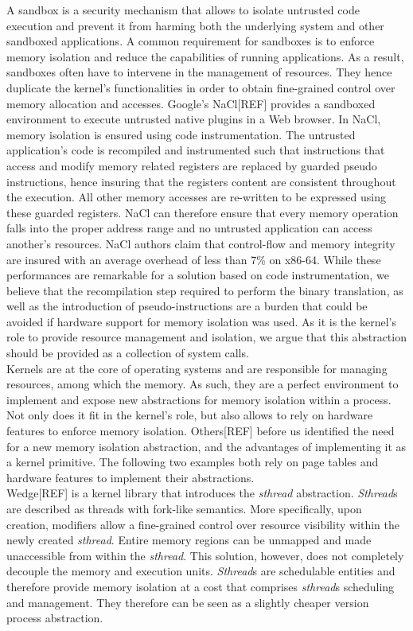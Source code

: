 \documentclass[letterpaper,twocolumn,10pt]{article}
\begin{document}
A sandbox is a security mechanism that allows to isolate untrusted code execution and prevent it from harming both the underlying system and other sandboxed applications.
A common requirement for sandboxes is to enforce memory isolation and reduce the capabilities of running applications.
As a result, sandboxes often have to intervene in the management of resources.
They hence duplicate the kernel's functionalities in order to obtain fine-grained control over memory allocation and accesses.
Google's NaCl[REF] provides a sandboxed environment to execute untrusted native plugins in a Web browser.
In NaCl, memory isolation is ensured using code instrumentation.
The untrusted application's code is recompiled and instrumented such that instructions that access and modify memory related registers are replaced by guarded pseudo instructions, hence insuring that the registers content are consistent throughout the execution.
All other memory accesses are re-written to be expressed using these guarded registers.
NaCl can therefore ensure that every memory operation falls into the proper address range and no untrusted application can access another's resources.
NaCl authors claim that control-flow and memory integrity are insured with an average overhead of less than 7\% on x86-64.
While these performances are remarkable for a solution based on code instrumentation, we believe that the recompilation step required to perform the binary translation, as well as the introduction of pseudo-instructions are a burden that could be avoided if hardware support for memory isolation was used.
As it is the kernel's role to provide resource management and isolation, we argue that this abstraction should be provided as a collection of system calls.\\


Kernels are at the core of operating systems and are responsible for managing resources, among which the memory.
As such, they are a perfect environment to implement and expose new abstractions for memory isolation within a process.
Not only does it fit in the kernel's role, but also allows to rely on hardware features to enforce memory isolation.
Others[REF] before us identified the need for a new memory isolation abstraction, and the advantages of implementing it as a kernel primitive.
The following two examples both rely on page tables and hardware features to implement their abstractions. \\

Wedge[REF] is a kernel library that introduces the \emph{sthread} abstraction.
\emph{Sthread}s are described as threads with fork-like semantics.
More specifically, upon creation, modifiers allow a fine-grained control over resource visibility within the newly created \emph{sthread}.
Entire memory regions can be unmapped and made unaccessible from within the \emph{sthread}.
This solution, however, does not completely decouple the memory and execution units.
\emph{Sthread}s are schedulable entities and therefore provide memory isolation at a cost that comprises \emph{sthread}s scheduling and management.
They therefore can be seen as a slightly cheaper version process abstraction.\\
\end{document}
